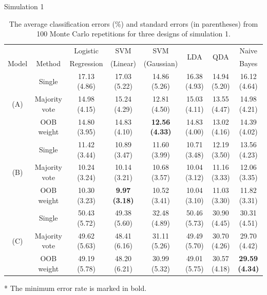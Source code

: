 \documentclass{beamer}
\begin{document}
\begin{frame}{Simulation 1}
	\begin{table}[h!]
		\footnotesize
		\centering
		\caption{The average classification errors (\%) and standard errors (in parentheses) from 100 Monte Carlo repetitions for three designs of simulation 1.}\label{t2}
		\tabcolsep=5pt
		\tiny
		\begin{tabular}{cccccccc}
			\hline\hline
			&        & Logistic   & SVM      & SVM        &   \multirow{2}{*}{LDA}  &  \multirow{2}{*}{QDA}   & Naive \\
			Model & Method & Regression & (Linear) & (Gaussian) &  &  & Bayes \\ 
			\hline
			\multirow{3}{*}{(A)} & Single        & 17.13 (4.86) & 17.03 (5.22) & 14.86 (5.26) & 16.38 (4.93) & 14.94 (5.20) & 16.12 (4.64) \\ 
			& Majority vote & 14.98 (4.15) & 15.24 (4.29) & 12.81 (4.50) & 15.03 (4.11) & 13.55 (4.47) & 14.98 (4.21) \\ 
			& OOB weight    & 14.80 (3.95) & 14.83 (4.10) & \textbf{12.56 (4.33)} & 14.83 (4.00) & 13.02 (4.16) & 14.39 (4.02) \\ 
			\hline
			\multirow{3}{*}{(B)} & Single        & 11.42 (3.44) & 10.89 (3.47) & 11.60 (3.99) & 10.71 (3.48) & 12.19 (3.50) & 13.56 (4.23) \\ 
			& Majority vote & 10.24 (3.24) & 10.14 (3.21) & 10.68 (3.57) & 10.04 (3.12) & 11.16 (3.33) & 12.06 (3.35) \\ 
			& OOB weight    & 10.30 (3.23) & \textbf{9.97 (3.18)} & 10.52 (3.41) & 10.04 (3.10) & 11.03 (3.30) & 11.82 (3.31) \\ 
			\hline
			\multirow{3}{*}{(C)} & Single        & 50.43 (5.72) & 49.38 (5.60) & 32.48 (4.89) & 50.46 (5.73) & 30.90 (4.45) & 30.31 (4.51) \\ 
			& Majority vote & 49.62 (5.63) & 48.41 (6.16) & 31.11 (5.26) & 49.49 (5.70) & 30.70 (4.26) & 29.70 (4.42) \\ 
			& OOB weight    & 49.19 (5.78) & 48.20 (6.21) & 30.99 (5.32) & 49.01 (5.75) & 30.57 (4.18) & \textbf{29.59 (4.34)} \\ 
			\hline\hline
		\end{tabular}
		\begin{tablenotes}
			\item[1] * The minimum error rate is marked in bold.
		\end{tablenotes}
	\end{table}
\end{frame}
\end{document}
